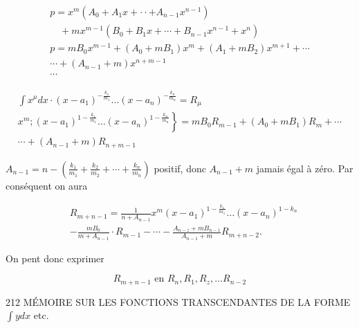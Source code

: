 \documentclass{article}
\begin{document}
\[
\begin{gathered}
p=x^{m}\left(A_{0}+A_{1} x+\cdot \cdot+A_{n-1} x^{n-1}\right) \\
\quad+m x^{m-1}\left(B_{0}+B_{1} x+\cdots+B_{n-1} x^{n-1}+x^{n}\right) \\
p=m B_{0} x^{m-1}+\left(A_{0}+m B_{1}\right) x^{m}+\left(A_{1}+m B_{2}\right) x^{m+1}+\cdots \\
\cdots+\left(A_{n-1}+m\right) x^{n+m-1} \\
\cdots
\end{gathered}
\]

\[
\begin{gathered}
\int x^{\mu} d x \cdot\left(x-a_{1}\right)^{-\frac{k_{1}}{m_{1}}} \ldots\left(x-a_{n}\right)^{-\frac{k_{n}}{m_{n}}}=R_{\mu} \\
\left.x^{m} ;\left(x-a_{1}\right)^{1-\frac{k_{1}}{m_{1}}} \ldots\left(x-a_{n}\right)^{1-\frac{k_{n}}{m_{n}}}\right\}=m B_{0} R_{m-1}+\left(A_{0}+m B_{1}\right) R_{m}+\cdots \\
\cdots+\left(A_{n-1}+m\right) R_{n+m-1}
\end{gathered}
\]

\(A_{n-1}=n-\left(\frac{k_{1}}{m_{1}}+\frac{k_{2}}{m_{2}}+\cdots+\frac{k_{n}}{m_{n}}\right)\) positif, donc \(A_{n-1}+m\) jamais égal à zéro. Par conséquent on aura

\[
\begin{aligned}
& R_{m+n-1}=\frac{1}{n+A_{n-1}} x^{m}\left(x-a_{1}\right)^{1-\frac{k_{1}}{m_{1}}} \ldots\left(x-a_{n}\right)^{1-k_{n}} \\
& -\frac{m B_{0}}{m+A_{n-1}} \cdot R_{m-1}-\cdots-\frac{A_{n-z}+m B_{n-1}}{A_{n-1}+m} R_{m+n-2} .
\end{aligned}
\]

On pent donc exprimer

\[
R_{m+n-1} \text { en } R_{n}, R_{1}, R_{z}, \ldots R_{n-2}
\]

212 MÉMOIRE SUR LES FONCTIONS TRANSCENDANTES DE LA FORME \(\int y d x\) etc.
\end{document}
